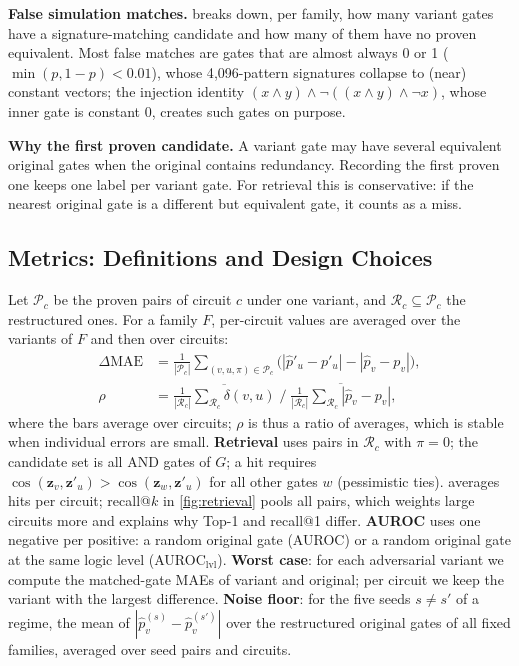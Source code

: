 
\noindent\textbf{False simulation matches.}  breaks down, per family, how many variant gates
have a signature-matching candidate and how many of them have no proven equivalent. Most false matches are
gates that are almost always 0 or 1 ($\min(p,1-p)<0.01$), whose 4{,}096-pattern signatures collapse to (near)
constant vectors; the injection identity $(x\wedge y)\wedge\neg((x\wedge y)\wedge\neg x)$, whose inner gate is constant 0, creates such
gates on purpose.


\noindent\textbf{Why the first proven candidate.} A variant gate may have several equivalent original gates
when the original contains redundancy. Recording the first proven one keeps one label per variant gate. For
retrieval this is conservative: if the nearest original gate is a different but equivalent gate, it counts as a
miss.

\FloatBarrier
\subsection{Metrics: Definitions and Design Choices}\label{app:metrics}
Let $\mathcal P_c$ be the proven pairs of circuit $c$ under one variant, and $\mathcal R_c\subseteq\mathcal P_c$ the
restructured ones. For a family $F$, per-circuit values are averaged over the variants of $F$ and then over circuits:
\begin{align*}
\Delta\mathrm{MAE}&=\tfrac1{|\mathcal P_c|}\textstyle\sum_{(v,u,\pi)\in\mathcal P_c}\big(|\hat p'_u-p'_u|-|\hat p_v-p_v|\big),\\
\rho&=\overline{\textstyle\frac1{|\mathcal R_c|}\sum_{\mathcal R_c}\delta(v,u)}\;\Big/\;\overline{\textstyle\frac1{|\mathcal R_c|}\sum_{\mathcal R_c}|\hat p_v-p_v|},
\end{align*}
where the bars average over circuits; $\rho$ is thus a ratio of averages, which is stable when individual errors
are small. \textbf{Retrieval} uses pairs in $\mathcal R_c$ with $\pi=0$; the candidate set is all AND gates of $G$;
a hit requires $\cos(\mathbf z_v,\mathbf z'_u)>\cos(\mathbf z_w,\mathbf z'_u)$ for all other gates $w$ (pessimistic
ties).  averages hits per circuit; recall@$k$ in \cref{fig:retrieval} pools all pairs, which
weights large circuits more and explains why Top-1 and recall@1 differ. \textbf{AUROC} uses one negative per
positive: a random original gate (AUROC) or a random original gate at the same logic level (AUROC$_\mathrm{lvl}$).
\textbf{Worst case}: for each adversarial variant we compute the matched-gate MAEs of variant and original;
per circuit we keep the variant with the largest difference. \textbf{Noise floor}: for the five seeds
$s\ne s'$ of a regime, the mean of $|\hat p^{(s)}_v-\hat p^{(s')}_v|$ over the restructured original gates of
all fixed families, averaged over seed pairs and circuits.

